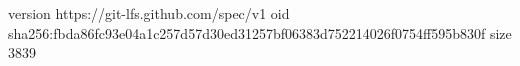 version https://git-lfs.github.com/spec/v1
oid sha256:fbda86fc93e04a1c257d57d30ed31257bf06383d752214026f0754ff595b830f
size 3839
